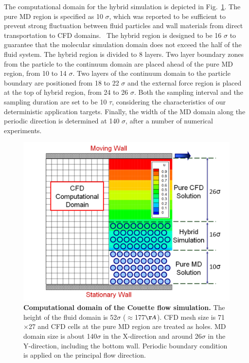 \documentclass[preprint,12pt]{elsarticle}
\begin{document}
The computational domain for the hybrid simulation is depicted in Fig.~\ref{Couette_Val_Domain}. The pure MD region is specified as 10 $\sigma$, which was reported to be sufficient to prevent strong fluctuation between fluid particles and wall materials from direct transportation to CFD domains.~\cite{Yen} The hybrid region is designed to be 16 $\sigma$ to guarantee that the molecular simulation domain does not exceed the half of the fluid system. The hybrid region is divided to 8 layers. Two layer boundary zones from the particle to the continuum domain are placed ahead of the pure MD region, from 10 to 14 $\sigma$. Two layers of the continuum domain to the particle boundary are positioned from 18 to 22 $\sigma$ and the external force region is placed at the top of hybrid region, from 24 to 26 $\sigma$. Both the sampling interval and the sampling duration are set to be 10 $\tau$, considering the characteristics of our deterministic application targets. Finally, the width of the MD domain along the periodic direction is determined at 140 $\sigma$, after a number of numerical experiments.


\begin{figure}
\centering
\includegraphics[width=0.8\linewidth]{Couette_Val_Domain.pdf}
\vskip-0.2cm
\caption{\small {\bf Computational domain of the Couette flow simulation.} The height of the fluid domain is 52$\sigma$ ($\approx$177$\AA$). CFD mesh size is 71$\times$27 and CFD cells at the pure MD region are treated as holes. MD domain size is about 140$\sigma$ in the X-direction and around 26$\sigma$ in the Y-direction, including the bottom wall. Periodic boundary condition is applied on the principal flow direction.}
\label{Couette_Val_Domain}
\end{figure}
\end{document}
